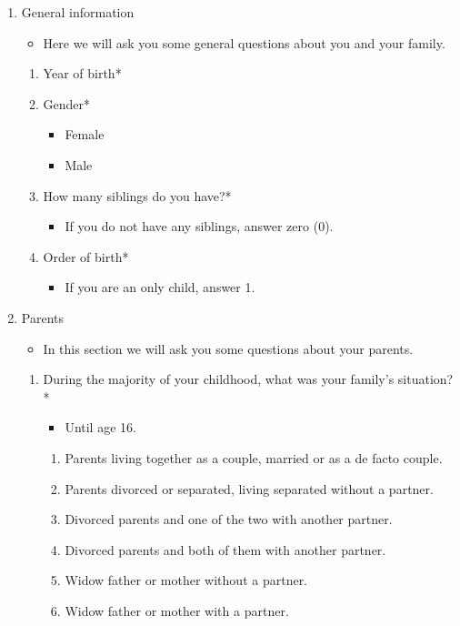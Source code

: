 \documentclass[12pt]{article}
\begin{document}
\begin{enumerate}
\item General information
\begin{itemize}
\item Here we will ask you some general questions about you and your family.
\end{itemize}
\begin{enumerate}
\item Year of birth*
\item Gender*
\begin{itemize}
\item Female
\item Male
\end{itemize}
\item How many siblings do you have?*
\begin{itemize}
\item If you do not have any siblings, answer zero (0).
\end{itemize}
\item Order of birth*
\begin{itemize}
\item If you are an only child, answer 1.
\end{itemize}
\end{enumerate}
\item Parents
\begin{itemize}
\item In this section we will ask you some questions about your parents.
\end{itemize}
\begin{enumerate}
\item During the majority of your childhood, what was your family's situation?*
\begin{itemize}
\item Until age 16.
\end{itemize}
\begin{enumerate}
\item Parents living together as a couple, married or as a de facto couple. 
\item Parents divorced or separated, living separated without a partner.
\item Divorced parents and one of the two with another partner.
\item Divorced parents and both of them with another partner.
\item Widow father or mother without a partner.
\item Widow father or mother with a partner.

\end{enumerate}
\end{enumerate}
\end{enumerate}
\end{document}
